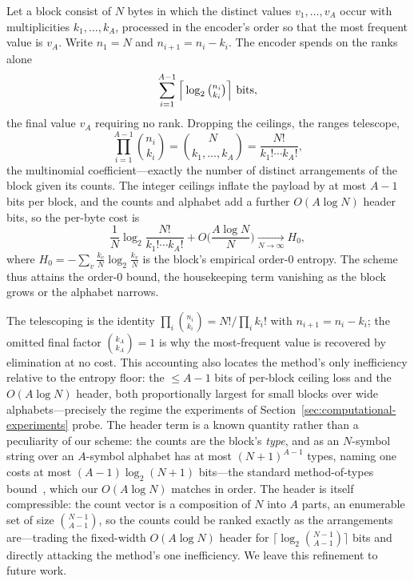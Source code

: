 \documentclass[entropy,article,submit,oneauthor,pdftex]{Definitions/mdpi}
\begin{document}
\begin{Proposition}\label{prop:order0}
Let a block consist of $N$ bytes in which the distinct values $v_1,\dots,v_A$
occur with multiplicities $k_1,\dots,k_A$, processed in the encoder's order so
that the most frequent value is $v_A$. Write $n_1=N$ and $n_{i+1}=n_i-k_i$. The
encoder spends on the ranks alone
\begin{equation*}
    \sum_{i=1}^{A-1}\Big\lceil\log_2\tbinom{n_i}{k_i}\Big\rceil \text{ bits},
\end{equation*}
the final value $v_A$ requiring no rank. Dropping the ceilings, the ranges
telescope,
\begin{equation*}
    \prod_{i=1}^{A-1}\binom{n_i}{k_i}
    =\binom{N}{k_1,\dots,k_A}
    =\frac{N!}{k_1!\cdots k_A!},
\end{equation*}
the multinomial coefficient---exactly the number of distinct arrangements of the
block given its counts. The integer ceilings inflate the payload by at most
$A-1$ bits per block, and the counts and alphabet add a further $O(A\log N)$
header bits, so the per-byte cost is
\begin{equation*}
    \frac1N\log_2\frac{N!}{k_1!\cdots k_A!}
    +O\!\Big(\frac{A\log N}{N}\Big)
    \xrightarrow[N\to\infty]{} H_0,
\end{equation*}
where $H_0=-\sum_v \tfrac{k_v}{N}\log_2\tfrac{k_v}{N}$ is the block's empirical
order-$0$ entropy. The scheme thus attains the order-$0$ bound, the housekeeping
term vanishing as the block grows or the alphabet narrows.
\end{Proposition}

\noindent The telescoping is the identity
$\prod_i\binom{n_i}{k_i}=N!/\prod_i k_i!$ with $n_{i+1}=n_i-k_i$; the omitted
final factor $\binom{k_A}{k_A}=1$ is why the most-frequent value is recovered by
elimination at no cost. This accounting also locates the method's only
inefficiency relative to the entropy floor: the $\le A-1$ bits of per-block
ceiling loss and the $O(A\log N)$ header, both proportionally largest for small
blocks over wide alphabets---precisely the regime the experiments of
Section~\ref{sec:computational-experiments} probe. The header term is a known
quantity rather than a peculiarity of our scheme: the counts are the block's
\emph{type}, and as an $N$-symbol string over an $A$-symbol alphabet has at most
$(N+1)^{A-1}$ types, naming one costs at most $(A-1)\log_2(N+1)$ bits---the standard
method-of-types bound~\cite{csiszar1998types}, which our $O(A\log N)$ matches in order.
The header is itself compressible: the count vector is a composition of $N$ into $A$
parts, an enumerable set of size $\binom{N-1}{A-1}$, so the counts could be ranked exactly
as the arrangements are---trading the fixed-width $O(A\log N)$ header for
$\lceil\log_2\binom{N-1}{A-1}\rceil$ bits and directly attacking the method's one
inefficiency. We leave this refinement to future work.
\end{document}
